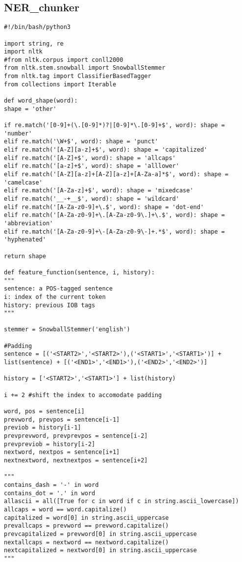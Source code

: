 \documentclass{pre-tfg}
\begin{document}
\subsection{NER\_chunker}
\begin{lstlisting}[style=consola]
#!/bin/bash/python3

import string, re
import nltk
#from nltk.corpus import conll2000
from nltk.stem.snowball import SnowballStemmer
from nltk.tag import ClassifierBasedTagger
from collections import Iterable

def word_shape(word):
shape = 'other'

if re.match('[0-9]+(\.[0-9]*)?|[0-9]*\.[0-9]+$', word): shape = 'number'
elif re.match('\W+$', word): shape = 'punct'
elif re.match('[A-Z][a-z]+$', word): shape = 'capitalized'
elif re.match('[A-Z]+$', word): shape = 'allcaps'
elif re.match('[a-z]+$', word): shape = 'alllower'
elif re.match('[A-Z][a-z]+[A-Z][a-z]+[A-Za-a]*$', word): shape = 'camelcase'
elif re.match('[A-Za-z]+$', word): shape = 'mixedcase'
elif re.match('__-+__$', word): shape = 'wildcard'
elif re.match('[A-Za-z0-9]+\.$', word): shape = 'dot-end'
elif re.match('[A-Za-z0-9]+\.[A-Za-z0-9\.]+\.$', word): shape = 'abbreviation'
elif re.match('[A-Za-z0-9]+\-[A-Za-z0-9\-]+.*$', word): shape = 'hyphenated'

return shape

def feature_function(sentence, i, history):
"""
sentence: a POS-tagged sentence
i: index of the current token
history: previous IOB tags
"""

stemmer = SnowballStemmer('english')

#Padding
sentence = [('<START2>','<START2>'),('<START1>','<START1>')] + list(sentence) + [('<END1>','<END1>'),('<END2>','<END2>')]

history = ['<START2>','<START1>'] + list(history)

i += 2 #shift the index to accomodate padding

word, pos = sentence[i]
prevword, prevpos = sentence[i-1]
previob = history[i-1]
prevprevword, prevprevpos = sentence[i-2]
prevpreviob = history[i-2]
nextword, nextpos = sentence[i+1]
nextnextword, nextnextpos = sentence[i+2]

"""
contains_dash = '-' in word
contains_dot = '.' in word
allascii = all([True for c in word if c in string.ascii_lowercase])
allcaps = word == word.capitalize()
capitalized = word[0] in string.ascii_uppercase
prevallcaps = prevword == prevword.capitalize()
prevcapitalized = prevword[0] in string.ascii_uppercase
nextallcaps = nextword == nextword.capitalize()
nextcapitalized = nextword[0] in string.ascii_uppercase
"""


\end{lstlisting}
\end{document}
